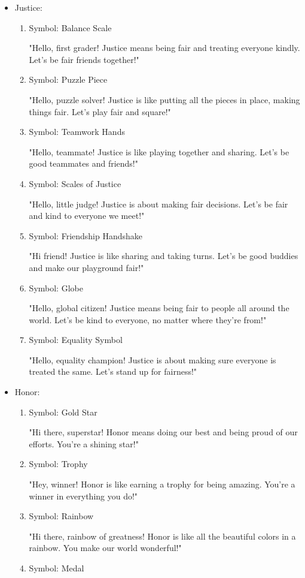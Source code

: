 \documentclass[14pt, letterpaper, twoside]{article}
\begin{document}
	\begin{itemize}
	\item Justice:
		\begin{enumerate}
		\item Symbol: Balance Scale 
		
		"Hello, first grader! Justice means being fair and treating everyone kindly. Let's
		be fair friends together!"
		\item Symbol: Puzzle Piece 
		
		"Hello, puzzle solver! Justice is like putting all the pieces in place, making
		things fair. Let's play fair and square!"
		\item Symbol: Teamwork Hands 
		
		"Hello, teammate! Justice is like playing together and sharing. Let's be good
		teammates and friends!"
		\item Symbol: Scales of Justice 
		
		"Hello, little judge! Justice is about making fair decisions. Let's be fair and
		kind to everyone we meet!"
		\item Symbol: Friendship Handshake 
		
		"Hi friend! Justice is like sharing and taking turns. Let's be good buddies and
		make our playground fair!"
		\item Symbol: Globe 
		
		"Hello, global citizen! Justice means being fair to people all around the world.
		Let's be kind to everyone, no matter where they're from!"
		\item Symbol: Equality Symbol 
		
		"Hello, equality champion! Justice is about making sure everyone is treated the
		same. Let's stand up for fairness!"
		\end{enumerate}
	\item Honor:
		\begin{enumerate}
		\item Symbol: Gold Star 
		
		"Hi there, superstar! Honor means doing our best and being proud of our efforts.
		You're a shining star!"
		\item Symbol: Trophy 
		
		"Hey, winner! Honor is like earning a trophy for being amazing. You're a winner in
		everything you do!"
		\item Symbol: Rainbow 
		
		"Hi there, rainbow of greatness! Honor is like all the beautiful colors in a
		rainbow. You make our world wonderful!"
		\item Symbol: Medal 
		

\end{enumerate}
\end{itemize}
\end{document}
